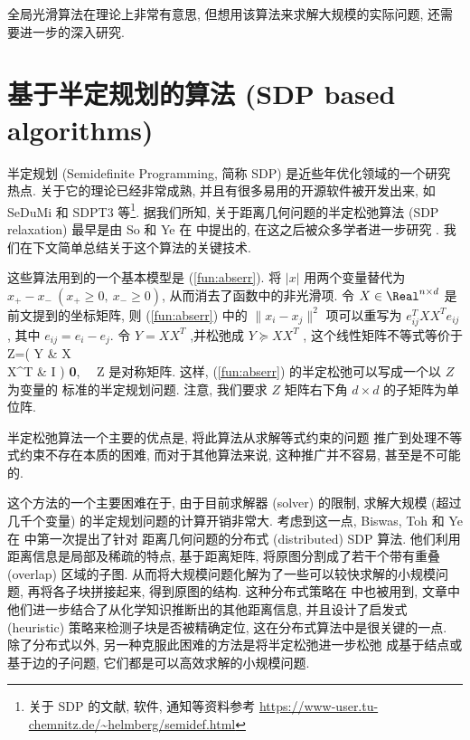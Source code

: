 全局光滑算法在理论上非常有意思, 但想用该算法来求解大规模的实际问题,
还需要进一步的深入研究.


\section{基于半定规划的算法 (SDP based algorithms)}
\label{sec:SDPalg}
半定规划 (Semidefinite Programming, 简称 SDP) 是近些年优化领域的一个研究热点.
关于它的理论已经非常成熟, 并且有很多易用的开源软件被开发出来,
如 SeDuMi 和 SDPT3 等\footnote{关于 SDP 的文献, 软件, 通知等资料参考
\url{https://www-user.tu-chemnitz.de/~helmberg/semidef.html}}. 
据我们所知, 关于距离几何问题的半定松弛算法 (SDP relaxation) 
最早是由 So 和 Ye 在 \cite{So2006} 中提出的, 
在这之后被众多学者进一步研究 \cite{Biswas2006-1,Biswas2008,Shamsi2010,Fang2013}. 
我们在下文简单总结关于这个算法的关键技术.

这些算法用到的一个基本模型是 (\ref{fun:abserr}). 
将 $|x|$ 用两个变量替代为 $x_+-x_- ~(x_+\geq 0,~x_-\geq 0)$, 
从而消去了函数中的非光滑项.
令 $X\in \Real^{n\times d}$ 是前文提到的坐标矩阵,
则 (\ref{fun:abserr}) 中的 $\|x_i-x_j\|^2$ 项可以重写为 $e_{ij}^TXX^Te_{ij}$, 
其中 $e_{ij}=e_i-e_j$. 
令 $Y=XX^T$ ,并松弛成 $Y\succeq XX^T$ \cite{Boyd1994}, 
这个线性矩阵不等式等价于
\be Z=\left( Y & X \\ X^T & I \ea \right) \succeq \textbf{0}, ~~Z \textrm{ 是对称矩阵}.\ee
这样, (\ref{fun:abserr}) 的半定松弛可以写成一个以 $Z$ 为变量的
标准的半定规划问题. 注意, 我们要求 $Z$ 矩阵右下角 $d \times d$ 的子矩阵为单位阵.

半定松弛算法一个主要的优点是, 将此算法从求解等式约束的问题
推广到处理不等式约束不存在本质的困难, 
而对于其他算法来说, 这种推广并不容易, 甚至是不可能的.

这个方法的一个主要困难在于, 由于目前求解器 (solver) 的限制,
求解大规模 (超过几千个变量) 的半定规划问题的计算开销非常大.
考虑到这一点, Biswas, Toh 和 Ye 在 \cite{Biswas2008} 中第一次提出了针对
距离几何问题的分布式 (distributed) SDP 算法.
他们利用距离信息是局部及稀疏的特点, 基于距离矩阵,
将原图分割成了若干个带有重叠 (overlap) 区域的子图.
从而将大规模问题化解为了一些可以较快求解的小规模问题,
再将各子块拼接起来, 得到原图的结构. 
这种分布式策略在 \cite{Fang2013} 中也被用到, 
文章中他们进一步结合了从化学知识推断出的其他距离信息, 
并且设计了启发式 (heuristic) 策略来检测子块是否被精确定位,
这在分布式算法中是很关键的一点.
除了分布式以外, 另一种克服此困难的方法是将半定松弛进一步松弛 \cite{Wang2008} 
成基于结点或基于边的子问题, 它们都是可以高效求解的小规模问题.



